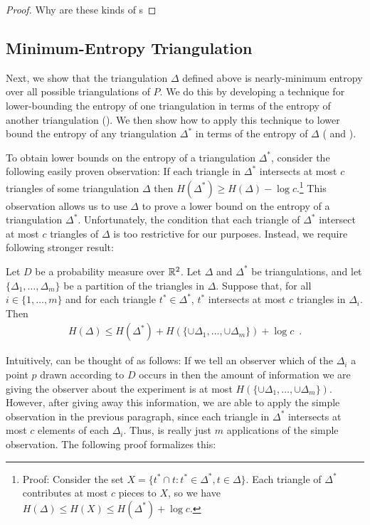 \documentclass[lotsofwhite]{patmorin}
\begin{document}
\begin{proof}
Why are these kinds of s
\end{proof}


\subsection{Minimum-Entropy Triangulation}

Next, we show that the triangulation $\Delta$ defined above is
nearly-minimum entropy over all possible triangulations of $P$.  We do
this by developing a technique for lower-bounding the entropy of one
triangulation in terms of the entropy of another triangulation
().  We then show how to apply this technique to lower
bound the entropy of any triangulation $\Delta^*$ in terms of the
entropy of $\Delta$ ( and ).
  
To obtain lower bounds on the entropy of a triangulation $\Delta^*$,
consider the following easily proven observation: If each triangle in
$\Delta^*$ intersects at most $c$ triangles of some triangulation
$\Delta$ then $H(\Delta^*) \ge H(\Delta) - \log c$.\footnote{Proof:
Consider the set $X=\{ t^*\cap t : t^*\in\Delta^*, t\in \Delta\}$.
Each triangle of $\Delta^*$ contributes at most $c$ pieces to $X$, so
we have $H(\Delta) \le H(X) \le H(\Delta^*) + \log c$.}  This
observation allows us to use $\Delta$ to prove a lower bound on the
entropy of a triangulation $\Delta^*$.  Unfortunately, the condition
that each triangle of $\Delta^*$ intersect at most $c$ triangles of
$\Delta$ is too restrictive for our purposes.  Instead, we require
following stronger result:

\begin{lem}
Let $D$ be a probability measure over $\mathbb{R}^2$.  Let $\Delta$ and
$\Delta^*$ be triangulations, and let $\{\Delta_1,\ldots,\Delta_m\}$
be a partition of the triangles in $\Delta$.  Suppose that, for all
$i\in\{1,\ldots,m\}$ and for each triangle $t^*\in\Delta^*$, $t^*$
intersects at most $c$ triangles in $\Delta_i$.  Then
\begin{eqnarray*}
   H(\Delta) \le 
	 H(\Delta^*) + H(\{\cup\Delta_1,\ldots,\cup\Delta_m\}) + \log c
 \enspace . 
\end{eqnarray*}
\end{lem}

Intuitively,  can be thought of as follows:  If we tell
an observer which of the $\Delta_i$ a point $p$ drawn according to $D$
occurs in then the amount of information we are giving the observer
about the experiment is at most
$H(\{\cup\Delta_1,\ldots,\cup\Delta_m\})$.  However, after giving away
this information, we are able to apply the simple observation in the
previous paragraph, since each triangle in $\Delta^*$ intersects at
most $c$ elements of each $\Delta_i$.  Thus,  is really
just $m$ applications of the simple observation.  The following proof
formalizes this:
\end{document}
